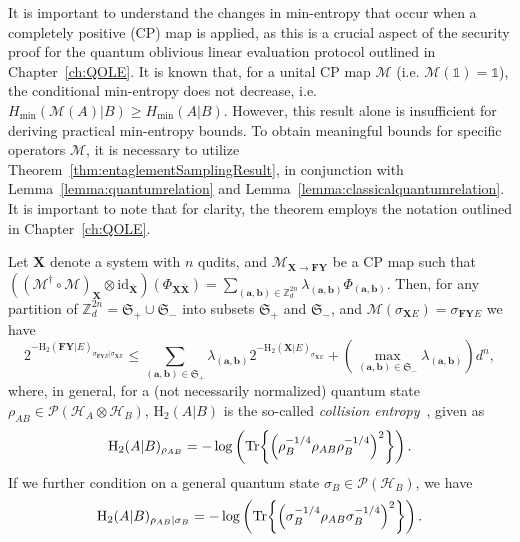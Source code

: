 It is important to understand the changes in min-entropy that occur when a completely positive (CP) map is applied, as this is a crucial aspect of the security proof for the quantum oblivious linear evaluation protocol outlined in Chapter~\ref{ch:QOLE}. It is known that, for a unital CP map $\mathcal{M}$ (i.e. $\mathcal{M}(\mathds{1}) = \mathds{1}$), the conditional min-entropy does not decrease, i.e. $H_{\min}(\mathcal{M}(A)| B) \geq H_{\min}(A| B)$. However, this result alone is insufficient for deriving practical min-entropy bounds. To obtain meaningful bounds for specific operators $\mathcal{M}$, it is necessary to utilize Theorem~\ref{thm:entaglementSamplingResult}, in conjunction with Lemma~\ref{lemma:quantumrelation} and Lemma~\ref{lemma:classicalquantumrelation}. It is important to note that for clarity, the theorem employs the notation outlined in Chapter~\ref{ch:QOLE}.


\begin{lemma} 
\label{thm:entaglementSamplingResult}
Let $\mathbf{X}$ denote a system with $n$ qudits, and  $\mathcal{M}_{\mathbf{X}\rightarrow \mathbf{F}\mathbf{Y}}$ be a CP map such that $((\mathcal{M}^\dagger \circ \mathcal{M})_{\mathbf{X}}\otimes \text{id}_{\bar{\mathbf{X}}})(\Phi_{\mathbf{X}\bar{\mathbf{X}}}) = \sum_{(\bm{a},\bm{b})\in\mathbb{Z}^{2n}_d} \lambda_{(\bm{a},\bm{b})} \Phi_{(\bm{a},\bm{b})}$. Then, for any partition of $\mathbb{Z}^{2n}_d = \mathfrak{S}_+ \cup \mathfrak{S}_-$ into subsets $\mathfrak{S}_+$ and $\mathfrak{S}_-$, and $\mathcal{M}(\sigma_{\mathbf{X}E}) = \sigma_{\mathbf{F}\mathbf{Y}E}$ we have 
\begin{equation}
    2^{-\text{H}_2(\mathbf{F}\mathbf{Y} | E)_{\sigma_{\mathbf{F}\mathbf{Y}E} | \sigma_{\mathbf{X}E}}} \leq \sum_{(\bm{a},\bm{b})\in\mathfrak{S}_+} \lambda_{(\bm{a},\bm{b})} 2^{-\text{H}_2(\mathbf{X} | E)_{\sigma_{\mathbf{X}E}}} + \left(\max_{(\bm{a},\bm{b})\in\mathfrak{S}_-} \lambda_{(\bm{a},\bm{b})}\right) d^n,
\end{equation}
 where, in general, for a (not necessarily normalized) quantum state $\rho_{AB}\in \mathcal{P}(\mathcal{H}_A\otimes\mathcal{H}_B)$, $\text{H}_2(A|B)$   is the so-called \textit{collision entropy}~\cite{R06}, given as 
\begin{equation*} 
    \text{H}_2(A|B)_{\rho_{AB}}=-\log \left(\Tr{\left(\rho_{B}^{-1/4}\rho_{AB}\rho_B^{-1/4}\right)^2}\right).
\end{equation*}
If we further condition on a general quantum state $\sigma_B\in\mathcal{P}(\mathcal{H}_B)$, we have 
\begin{equation*}
    \text{H}_2(A|B)_{\rho_{AB}|\sigma_B}=-\log \left(\Tr{\left(\sigma_{B}^{-1/4}\rho_{AB}\sigma_B^{-1/4}\right)^2}\right).
\end{equation*}
\end{lemma}

